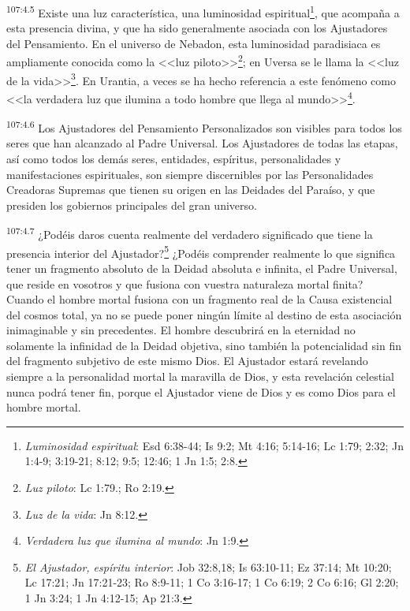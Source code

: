 \documentclass[twoside, 11pt]{book}
\begin{document}
\par
\textsuperscript{107:4.5} Existe una luz característica, una luminosidad espiritual\footnote{\textit{Luminosidad espiritual}: Esd 6:38-44; Is 9:2; Mt 4:16; 5:14-16; Lc 1:79; 2:32; Jn 1:4-9; 3:19-21; 8:12; 9:5; 12:46; 1 Jn 1:5; 2:8.}, que acompaña a esta presencia divina, y que ha sido generalmente asociada con los Ajustadores del Pensamiento. En el universo de Nebadon, esta luminosidad paradisiaca es ampliamente conocida como la <<luz piloto>>\footnote{\textit{Luz piloto}: Lc 1:79.; Ro 2:19.}; en Uversa se le llama la <<luz de la vida>>\footnote{\textit{Luz de la vida}: Jn 8:12.}. En Urantia, a veces se ha hecho referencia a este fenómeno como <<la verdadera luz que ilumina a todo hombre que llega al mundo>>\footnote{\textit{Verdadera luz que ilumina al mundo}: Jn 1:9.}.

\par
\textsuperscript{107:4.6} Los Ajustadores del Pensamiento Personalizados son visibles para todos los seres que han alcanzado al Padre Universal. Los Ajustadores de todas las etapas, así como todos los demás seres, entidades, espíritus, personalidades y manifestaciones espirituales, son siempre discernibles por las Personalidades Creadoras Supremas que tienen su origen en las Deidades del Paraíso, y que presiden los gobiernos principales del gran universo.

\par
\textsuperscript{107:4.7} ¿Podéis daros cuenta realmente del verdadero significado que tiene la presencia interior del Ajustador?\footnote{\textit{El Ajustador, espíritu interior}: Job 32:8,18; Is 63:10-11; Ez 37:14; Mt 10:20; Lc 17:21; Jn 17:21-23; Ro 8:9-11; 1 Co 3:16-17; 1 Co 6:19; 2 Co 6:16; Gl 2:20; 1 Jn 3:24; 1 Jn 4:12-15; Ap 21:3.} ¿Podéis comprender realmente lo que significa tener un fragmento absoluto de la Deidad absoluta e infinita, el Padre Universal, que reside en vosotros y que fusiona con vuestra naturaleza mortal finita? Cuando el hombre mortal fusiona con un fragmento real de la Causa existencial del cosmos total, ya no se puede poner ningún límite al destino de esta asociación inimaginable y sin precedentes. El hombre descubrirá en la eternidad no solamente la infinidad de la Deidad objetiva, sino también la potencialidad sin fin del fragmento subjetivo de este mismo Dios. El Ajustador estará revelando siempre a la personalidad mortal la maravilla de Dios, y esta revelación celestial nunca podrá tener fin, porque el Ajustador viene de Dios y es como Dios para el hombre mortal.
\end{document}
